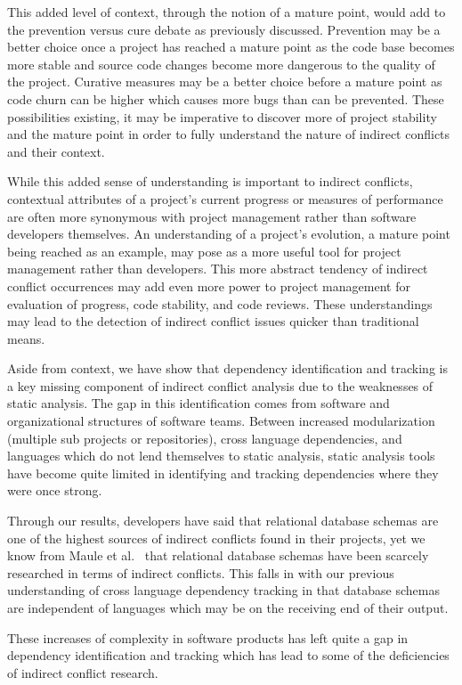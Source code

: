 \documentclass[conference]{IEEEtran}
\begin{document}
This added level of context, through the notion of a mature point, 
would add to the prevention versus cure debate as previously discussed. Prevention may be a better
choice once a project has reached a mature point as the code base becomes more stable and source code changes become more dangerous
to the quality of the project. Curative measures may be a better choice before a mature point as code churn can be higher which
causes more bugs than can be prevented. These possibilities existing, it may be imperative to discover more of project stability
and the mature point in order to fully understand the nature of indirect conflicts and their context.

While this added sense of understanding is important to indirect conflicts, contextual attributes of a project's current progress
or measures of performance are often more synonymous with project management
rather than software developers themselves. An understanding of a project's evolution, a mature point being reached as an example,
may pose as a more useful tool for project management rather than developers. This more abstract tendency of indirect
conflict occurrences may add even more power to project management for evaluation of progress, code stability, and code reviews.
These understandings may lead to the detection of indirect conflict issues quicker than traditional means.

Aside from context, we have show that dependency identification and tracking is a key missing component of
indirect conflict analysis due to the weaknesses of static analysis. The gap in this identification comes from software and 
organizational structures of software teams. Between increased modularization (multiple sub projects or repositories), 
cross language dependencies, and languages which do not lend themselves to static analysis, static analysis tools have 
become quite limited in identifying and tracking dependencies where they were once strong.

Through our results, developers have said that relational database schemas are one of the highest sources of indirect
conflicts found in their projects, yet we know from Maule et al.~\cite{Maule:2008:IAD} that relational database schemas have 
been scarcely researched in terms of indirect conflicts. This falls in with our previous understanding of cross language
dependency tracking in that database schemas are independent of languages which may be on the receiving end of their output.

These increases of complexity in software products has left quite a gap in dependency identification and tracking which 
has lead to some of the deficiencies of indirect conflict research.
\end{document}

